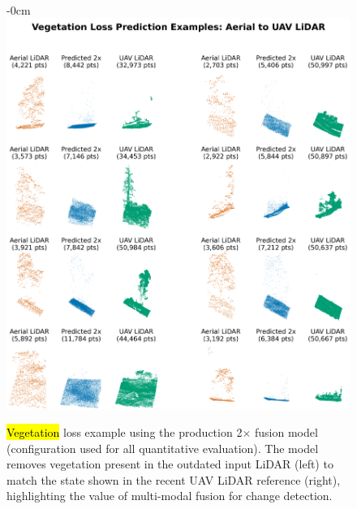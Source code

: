 \documentclass[remotesensing,article,accept,pdftex,moreauthors]{Definitions/mdpi}
\begin{document}
\begin{figure}[H]
\begin{adjustwidth}{-\extralength}{0cm}
    \centering
    \includegraphics[width=0.98\linewidth]{figures/veg_loss_2x.png}
    \end{adjustwidth}
    \caption{\hl{Vegetation} %
 loss example using the production 2$\times$ fusion model (configuration used for all quantitative evaluation). The model removes vegetation present in the outdated input LiDAR (left) to match the state shown in the recent UAV LiDAR reference (right), highlighting the value of multi-modal fusion for change detection.}
   \label{fig:appendix_loss}
\end{figure}

\end{document}

